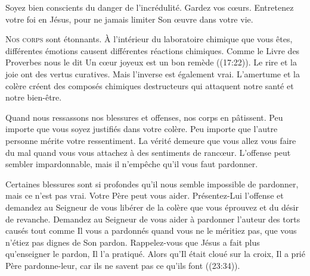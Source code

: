 Soyez bien conscients du danger de l'incrédulité. Gardez vos c\oe{}urs.
 Entretenez votre foi en Jésus,
 pour ne jamais limiter Son \oe{}uvre dans votre vie.

\dvrule






\lettrine{N}{os corps} sont étonnants. À l'intérieur du laboratoire
 chimique que vous êtes, différentes émotions causent différentes
 réactions chimiques. Comme le Livre des Proverbes nous le dit\frcolon{} 
 \Og Un c\oe{}ur joyeux est un bon remède \Fg{} ((17:22)).
 Le rire et la joie ont des vertus curatives.
 Mais l'inverse est également vrai. L'amertume et la colère
 créent des composés chimiques destructeurs qui attaquent
 notre santé et notre bien-être.


Quand nous ressassons nos blessures et offenses, nos corps en pâtissent.
 Peu importe que vous soyez justifiés dans votre colère.
 Peu importe que l'autre personne mérite votre ressentiment.
 La vérité demeure que vous allez vous faire du mal quand vous vous
 attachez à des sentiments de ranc\oe{}ur.
 L'offense peut sembler impardonnable,
 mais il n'empêche qu'il vous faut pardonner.

Certaines blessures sont si profondes qu'il nous semble impossible
 de pardonner, mais ce n'est pas vrai. Votre Père peut vous aider.
 Présentez-Lui  l'offense et demandez 
 au Seigneur de vous libérer de la colère que vous éprouvez
 et du désir de revanche. Demandez au Seigneur de vous aider à pardonner
 l'auteur des torts causés \ocadr tout comme Il vous a pardonnés
 quand vous ne le méritiez pas, que vous n'étiez pas dignes de Son pardon.
 Rappelez-vous que Jésus a fait plus qu'enseigner le pardon, Il l'a pratiqué.
 Alors qu'Il était cloué sur la croix, Il a prié\frcolon{} 
 \Og Père pardonne-leur, car ils ne savent pas ce qu'ils font \Fg{}
 ((23:34)).

